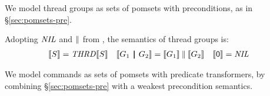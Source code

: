 We model thread groups as sets of pomsets with preconditions,
as in \S\ref{sec:pomsets-pre}.

\begin{definition}
  \noindent
  Adopting $\textnormal{\textit{NIL}}$ and $\mathbin{\parallel}$ from ,
  the semantics of thread groups is:
  \begin{align*}
    \sem{\THREAD{\aCmd}} &= \sTHREAD{}\sem{\aCmd}
    &
    \sem{\aGrp_1 \PAR \aGrp_2} &= \sem{\aGrp_1}\sPAR\sem{\aGrp_2}      
    &
    \sem{\NIL} &= \sNIL     
  \end{align*}
\end{definition}

We model commands as sets of pomsets with predicate transformers,
by combining \S\ref{sec:pomsets-pre} with a weakest precondition
semantics.


